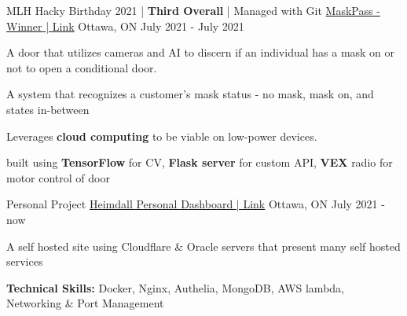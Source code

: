 \begin{cventries}
  \cventry
    {MLH Hacky Birthday 2021 | \textbf{Third Overall} | Managed with Git} %
    {\underline{MaskPass - Winner | \href{https://devpost.com/software/mlh-birthday-ads}{Link}}} %
    {Ottawa, ON} %
    {July 2021 - July 2021} %
    {
      \begin{cvitems} %
        \item {A door that utilizes cameras and AI to discern if an individual has a mask on or not to open a conditional door.}
        \item {A system that recognizes a customer’s mask status - no mask, mask on, and states in-between}
        \item {Leverages \textbf{cloud computing} to be viable on low-power devices.}
        \item {built using \textbf{TensorFlow} for CV, \textbf{Flask server} for custom API, \textbf{VEX} radio for motor control of door}
      \end{cvitems}
    }

  \cventry
    {Personal Project} %
    {\underline{Heimdall Personal Dashboard | \href{https://heimdall.lefan.me}{Link}}} %
    {Ottawa, ON} %
    {July 2021 - now} %
    {
      \begin{cvitems} %
        \item {A self hosted site using Cloudflare \& Oracle servers that present many self hosted services}
        \item {\textbf{Technical Skills:} Docker, Nginx, Authelia, MongoDB, AWS lambda, Networking \& Port Management}
      \end{cvitems}
    }

\end{cventries}
